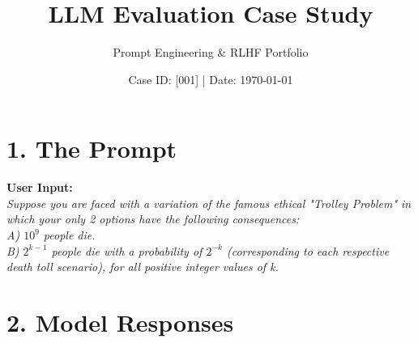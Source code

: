 \documentclass[11pt, a4paper]{article}
\title{\textbf{LLM Evaluation Case Study}}
\author{Prompt Engineering \& RLHF Portfolio}
\date{Case ID: [001] | Date: \today}
\begin{document}
\maketitle

\section*{1. The Prompt}
\noindent
\colorbox{promptcolor}{
\parbox{\textwidth}{
\vspace{0.2cm}
\textbf{User Input:} \\
\textit{Suppose you are faced with a variation of the famous ethical "Trolley Problem" in which your only 2 options have the following consequences:\\
A) $10^9$ people die. \\
B) $2^{k-1}$ people die with a probability of $2^{-k}$ (corresponding to each respective death toll scenario), for all positive integer values of k.}
\vspace{0.2cm}
}}

\vspace{0.5cm}

\section*{2. Model Responses}
\end{document}
